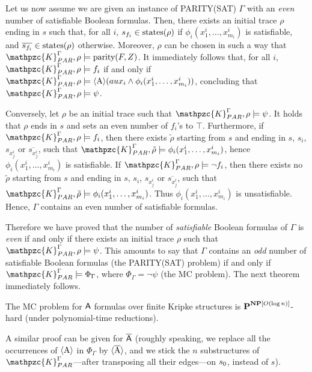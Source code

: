 Let us now assume we are given an instance of PARITY(SAT) $\Gamma$ with an \emph{even} number of satisfiable Boolean formulas. Then, there exists an initial trace $\rho$ ending in $s$ such that, for all $i$, $s_{f_i}\in\operatorname{states}(\rho)$ if $\phi_i(x_1^i,\ldots , x_{m_i}^i)$ is satisfiable, and $\overline{s_{f_i}}\in\operatorname{states}(\rho)$ otherwise. Moreover, $\rho$ can be chosen in such a way that $\mathpzc{K}_{PAR}^{\Gamma},\rho\models  \text{parity}(F,Z)$. It immediately follows that, for all $i$, $\mathpzc{K}_{PAR}^{\Gamma},\rho\models f_i$ if and only if $\mathpzc{K}_{PAR}^{\Gamma},\rho\models \hsA(aux_i \wedge \phi_i(x_1^i,\ldots , x_{m_i}^i))$, concluding that $\mathpzc{K}_{PAR}^{\Gamma},\rho\models \psi$.

Conversely, let $\rho$ be  an initial trace such that $\mathpzc{K}_{PAR}^{\Gamma},\rho\models \psi$. It holds that 
$\rho$ ends in $s$ and sets an even number of $f_i$'s to $\top$. Furthermore, if $\mathpzc{K}_{PAR}^{\Gamma},\rho\models f_i$, then there exists $\tilde{\rho}$ starting from $s$ and ending in $s$, $s_i$, $s_{x_j^i}$ or $\overline{s_{x_j^i}}$, such that $\mathpzc{K}_{PAR}^{\Gamma},\tilde{\rho}\models\phi_i(x_1^i,\ldots , x_{m_i}^i)$, hence $\phi_i(x_1^i,\ldots , x_{m_i}^i)$ is satisfiable.
If $\mathpzc{K}_{PAR}^{\Gamma},\rho\models \neg f_i$, then there exists no $\tilde{\rho}$ starting from $s$ and ending in $s$, $s_i$, $s_{x_j^i}$ or $\overline{s_{x_j^i}}$, such that $\mathpzc{K}_{PAR}^{\Gamma},\tilde{\rho}\models\phi_i(x_1^i,\ldots , x_{m_i}^i)$. Thus $\phi_i(x_1^i,\ldots , x_{m_i}^i)$ is unsatisfiable. Hence, $\Gamma$ contains an even number of satisfiable formulas.

Therefore we have proved that the number of \emph{satisfiable} Boolean formulas of $\Gamma$ is \emph{even} if and only if there exists an initial trace $\rho$ such that $\mathpzc{K}_{PAR}^{\Gamma},\rho\models \psi$. 
This amounts to say that $\Gamma$ contains an \emph{odd} number of satisfiable Boolean formulas (the PARITY(SAT) problem) if and only if $\mathpzc{K}_{PAR}^{\Gamma}\models \Phi_{\Gamma}$, where $\Phi_{\Gamma}=\neg\psi$ (the MC problem).
The next theorem immediately follows.
\begin{theorem}
The MC problem for $\mathsf{A}$ formulas over finite Kripke structures is $\textbf{P}^{\textbf{NP}[O(\log n)]}$-hard (under polynomial-time reductions).
\end{theorem}

A similar proof can be given for $\mathsf{\overline{A}}$ (roughly speaking, we replace all the occurrences of $\operatorname{\langle A\rangle}$ in $\Phi_{\Gamma}$ by $\operatorname{\langle \overline{A}\rangle}$, and we stick the $n$ substructures of $\mathpzc{K}_{PAR}^{\Gamma}$---after transposing all their edges---on $s_0$, instead of $s$).

